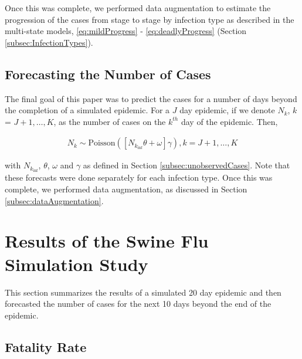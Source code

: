 \documentclass[12pt]{article}
\begin{document}
Once this was complete, we performed data augmentation to estimate the progression of the cases from stage to stage by infection type as described in the 
multi-state models, \ref{eq:mildProgress} - \ref{eq:deadlyProgress} (Section \ref{subsec:InfectionTypes}).


\subsection{Forecasting the Number of Cases}
\label{subsec:forecasting}

The final goal of this paper was to predict the cases for a number of days beyond the completion of a simulated epidemic.  For a $J$ day
epidemic, if we denote $N_k$, $k$ = $J+1, \ldots, K$, as the number of cases on the $k^{th}$ day of the epidemic.  Then,

\begin{eqnarray*}
N_{k} \sim \mbox{Poisson}([N_{k_{\mbox{inf}}} \theta + \omega]\gamma), k = {J+1}, \ldots, K
\end{eqnarray*}

\noindent with $N_{k_{\mbox{inf}}}$, $\theta$, $\omega$ and $\gamma$ as defined in Section \ref{subsec:unobservedCases}.  Note that these forecasts were done separately
for each infection type.  Once this was complete, we performed data augmentation, as discussed in Section \ref{subsec:dataAugmentation}. 

                                                                                                                                              
\section{Results of the Swine Flu Simulation Study}
\label{sec:simStudyResults}

This section summarizes the results of a simulated 20 day epidemic and then forecasted the number of cases for the next 10 days beyond the end of the
epidemic. 


\subsection{Fatality Rate}
\label{subsec:fatalityRate}
\end{document}
